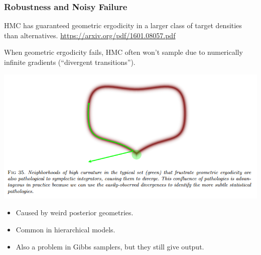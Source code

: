 \documentclass[xcolor=dvipsnames]{beamer}
\begin{document}
\begin{frame}
\frametitle{Robustness and Noisy Failure}
HMC has guaranteed geometric ergodicity in a larger class of target densities than alternatives. {\scriptsize \url{https://arxiv.org/pdf/1601.08057.pdf}}

\vspace{0.5cm}

When geometric ergodicity fails, HMC often won't sample due to numerically infinite gradients (``divergent transitions'').
\begin{center}
\includegraphics[height = 0.4\textheight]{divergent.png}
\end{center}
\begin{itemize}
\item Caused by weird posterior geometries.
\item Common in hierarchical models.
\item Also a problem in Gibbs samplers, but they still give output.
\end{itemize}
\end{frame}
\end{document}
